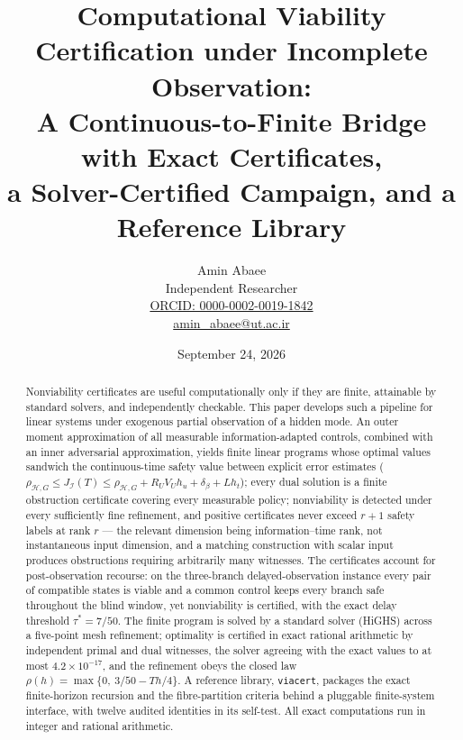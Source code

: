 \documentclass[10pt,twocolumn]{article}
\theoremstyle{plain}
\theoremstyle{definition}
\theoremstyle{remark}
\begin{document}
\title{Computational Viability Certification under Incomplete Observation:\\
A Continuous-to-Finite Bridge with Exact Certificates,\\
a Solver-Certified Campaign, and a Reference Library}
\author{Amin Abaee\\[0.35em]
{\small Independent Researcher}\\[0.55em]
{\small\href{https://orcid.org/0000-0002-0019-1842}{ORCID: 0000-0002-0019-1842}}\\[0.3em]
{\small\href{mailto:amin\_abaee@ut.ac.ir}{amin\_abaee@ut.ac.ir}}}
\date{September 24, 2026}
\maketitle

\begin{abstract}
Nonviability certificates are useful computationally only if they are finite,
attainable by standard solvers, and independently checkable. This paper
develops such a pipeline for linear systems under exogenous partial
observation of a hidden mode. An outer moment approximation of all measurable
information-adapted controls, combined with an inner adversarial approximation,
yields finite linear programs whose optimal values sandwich the
continuous-time safety value between explicit error estimates
(\(\rho_{\mathcal{H},G} \le J_{\mathcal{I}}(T) \le \rho_{\mathcal{H},G} +
R_U V_U h_u + \delta_\beta + L h_t\)); every dual solution is a finite
obstruction certificate covering every measurable policy; nonviability is
detected under every sufficiently fine refinement, and positive certificates
never exceed \(r + 1\) safety labels at rank \(r\) --- the relevant dimension
being information--time rank, not instantaneous input dimension, and a
matching construction with scalar input produces obstructions requiring
arbitrarily many witnesses. The certificates account for post-observation
recourse: on the three-branch delayed-observation instance every pair of
compatible states is viable and a common control keeps every branch safe
throughout the blind window, yet nonviability is certified, with the exact
delay threshold \(\tau^{*} = 7/50\). The finite program is solved by a
standard solver (HiGHS) across a five-point mesh refinement; optimality is
certified in exact rational arithmetic by independent primal and dual
witnesses, the solver agreeing with the exact values to at most
\(4.2 \times 10^{-17}\), and the refinement obeys the closed law
\(\rho(h) = \max\{0,\ 3/50 - Th/4\}\). A reference library,
\texttt{viacert}, packages the exact finite-horizon recursion and the
fibre-partition criteria behind a pluggable finite-system interface, with
twelve audited identities in its self-test. All exact computations run in
integer and rational arithmetic.
\end{abstract}
\end{document}
